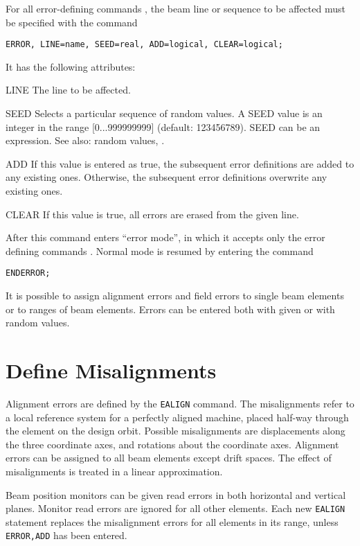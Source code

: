 For all error-defining commands ,
the beam line  or sequence  to be
affected must be specified with the command
\begin{verbatim}
ERROR, LINE=name, SEED=real, ADD=logical, CLEAR=logical;
\end{verbatim}
It has the following attributes:
\begin{kdescription}
\item[LINE]
  The line to be affected.
\item[SEED]
  Selects a particular sequence of random values.
  A SEED value is an integer in the range [0...999999999] (default: 123456789).
  SEED can be an expression.
  See also: random values, .
\item[ADD]
  If this value is entered as true, the subsequent error definitions
  are added to any existing ones.
  Otherwise, the subsequent error definitions overwrite any existing
  ones.
\item[CLEAR]
  If this value is true, all errors are erased from the given line.
\end{kdescription}
After this command \opal enters ``error mode'', in which it accepts only
the error defining commands .
Normal mode is resumed by entering the command
\begin{verbatim}
ENDERROR;
\end{verbatim}
It is possible to assign alignment errors and field errors
to single beam elements or to ranges of beam elements.
Errors can be entered both with given or with random values.

\section{Define Misalignments}
\label{sec:erroralign}
Alignment errors are defined by the \texttt{EALIGN} command.
The misalignments refer to a local reference system 
for a perfectly aligned machine, placed half-way through the element
on the design orbit.
Possible misalignments are displacements along the three coordinate axes,
and rotations about the coordinate axes.
Alignment errors can be assigned to all beam elements except drift spaces.
The effect of misalignments is treated in a linear approximation.

Beam position monitors 
can be given read errors in both horizontal and vertical planes.
Monitor read errors are ignored for all other elements.
Each new \texttt{EALIGN} statement replaces the misalignment errors
for all elements in its range, unless \texttt{ERROR,ADD}
has been entered.

